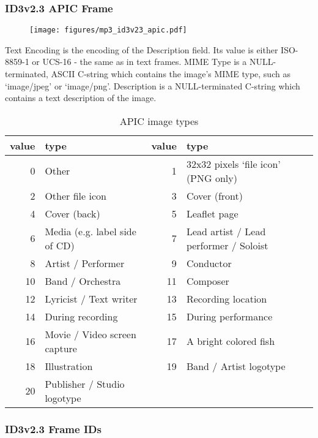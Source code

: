 \subsubsection{ID3v2.3 APIC Frame}
\begin{figure}[h]
\texttt{[image: figures/mp3\_id3v23\_apic.pdf]}
\end{figure}
Text Encoding is the encoding of the Description field.
Its value is either ISO-8859-1 or UCS-16 - the same as in
text frames.
MIME Type is a NULL-terminated, ASCII C-string which contains the
image's MIME type, such as `image/jpeg' or `image/png'.
Description is a NULL-terminated C-string which contains
a text description of the image.
\begin{table}[h]
{
\begin{tabular}{|r|l||r|l|}
\hline
value & type & value & type \\
\hline
0 & Other & 1 & 32x32 pixels `file icon' (PNG only) \\
2 & Other file icon & 3 & Cover (front) \\
4 & Cover (back) & 5 & Leaflet page \\
6 & Media (e.g. label side of CD) & 7 & Lead artist / Lead performer / Soloist \\
8 & Artist / Performer & 9 & Conductor \\
10 & Band / Orchestra & 11 & Composer \\
12 & Lyricist / Text writer & 13 & Recording location \\
14 & During recording & 15 & During performance \\
16 & Movie / Video screen capture & 17 & A bright colored fish \\
18 & Illustration & 19 & Band / Artist logotype \\
20 & Publisher / Studio logotype & &  \\
\hline
\end{tabular}
\caption{APIC image types}
}
\end{table}

\pagebreak

\subsubsection{ID3v2.3 Frame IDs}

